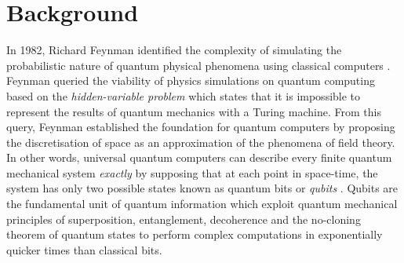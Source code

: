 \section{\label{sec:background}Background}

In 1982, Richard Feynman identified the complexity of simulating the probabilistic nature of quantum physical phenomena using classical computers \cite{feynman2018simulating}. Feynman queried the viability of physics simulations on quantum computing based on the \textit{hidden-variable problem} which states that it is impossible to represent the results of quantum mechanics with a Turing machine. From this query, Feynman established the foundation for quantum computers by proposing the discretisation of space as an approximation of the phenomena of field theory. In other words, universal quantum computers can describe every finite quantum mechanical system \textit{exactly} by supposing that at each point in space-time, the system has only two possible states known as quantum bits or \textit{qubits} \cite{feynman1981simulating}. Qubits are the fundamental unit of quantum information which exploit quantum mechanical principles of superposition, entanglement, decoherence and the no-cloning theorem of quantum states to perform complex computations in exponentially quicker times than classical bits.

